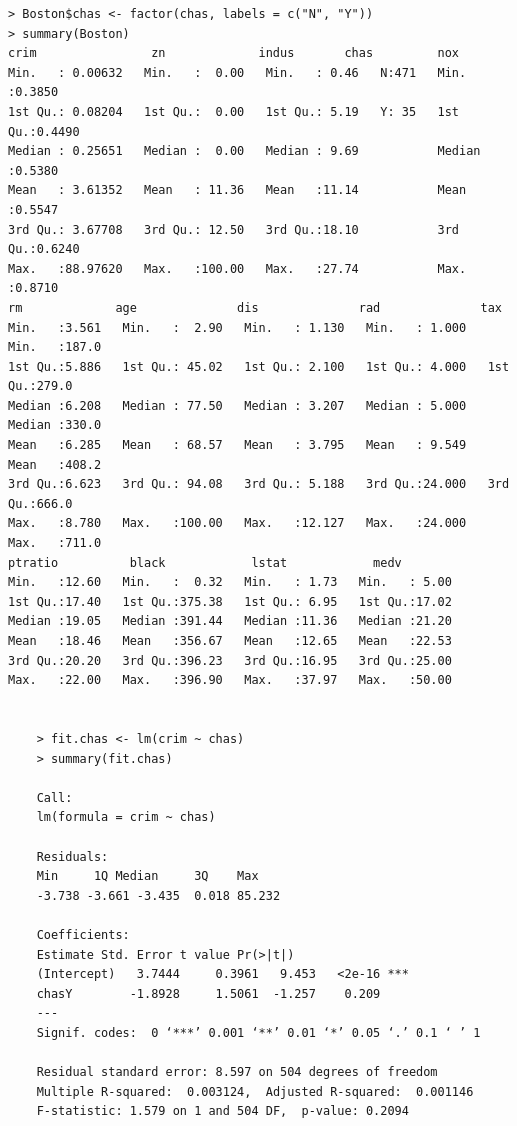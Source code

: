 \documentclass{article}
\begin{document}
\begin{itemize}
\begin{program}
	\begin{verbatim}
> Boston$chas <- factor(chas, labels = c("N", "Y"))
> summary(Boston)
crim                zn             indus       chas         nox        
Min.   : 0.00632   Min.   :  0.00   Min.   : 0.46   N:471   Min.   :0.3850  
1st Qu.: 0.08204   1st Qu.:  0.00   1st Qu.: 5.19   Y: 35   1st Qu.:0.4490  
Median : 0.25651   Median :  0.00   Median : 9.69           Median :0.5380  
Mean   : 3.61352   Mean   : 11.36   Mean   :11.14           Mean   :0.5547  
3rd Qu.: 3.67708   3rd Qu.: 12.50   3rd Qu.:18.10           3rd Qu.:0.6240  
Max.   :88.97620   Max.   :100.00   Max.   :27.74           Max.   :0.8710  
rm             age              dis              rad              tax       
Min.   :3.561   Min.   :  2.90   Min.   : 1.130   Min.   : 1.000   Min.   :187.0  
1st Qu.:5.886   1st Qu.: 45.02   1st Qu.: 2.100   1st Qu.: 4.000   1st Qu.:279.0  
Median :6.208   Median : 77.50   Median : 3.207   Median : 5.000   Median :330.0  
Mean   :6.285   Mean   : 68.57   Mean   : 3.795   Mean   : 9.549   Mean   :408.2  
3rd Qu.:6.623   3rd Qu.: 94.08   3rd Qu.: 5.188   3rd Qu.:24.000   3rd Qu.:666.0  
Max.   :8.780   Max.   :100.00   Max.   :12.127   Max.   :24.000   Max.   :711.0  
ptratio          black            lstat            medv      
Min.   :12.60   Min.   :  0.32   Min.   : 1.73   Min.   : 5.00  
1st Qu.:17.40   1st Qu.:375.38   1st Qu.: 6.95   1st Qu.:17.02  
Median :19.05   Median :391.44   Median :11.36   Median :21.20  
Mean   :18.46   Mean   :356.67   Mean   :12.65   Mean   :22.53  
3rd Qu.:20.20   3rd Qu.:396.23   3rd Qu.:16.95   3rd Qu.:25.00  
Max.   :22.00   Max.   :396.90   Max.   :37.97   Max.   :50.00  
	
	
	> fit.chas <- lm(crim ~ chas)
	> summary(fit.chas)
	
	Call:
	lm(formula = crim ~ chas)
	
	Residuals:
	Min     1Q Median     3Q    Max 
	-3.738 -3.661 -3.435  0.018 85.232 
	
	Coefficients:
	Estimate Std. Error t value Pr(>|t|)    
	(Intercept)   3.7444     0.3961   9.453   <2e-16 ***
	chasY        -1.8928     1.5061  -1.257    0.209    
	---
	Signif. codes:  0 ‘***’ 0.001 ‘**’ 0.01 ‘*’ 0.05 ‘.’ 0.1 ‘ ’ 1
	
	Residual standard error: 8.597 on 504 degrees of freedom
	Multiple R-squared:  0.003124,	Adjusted R-squared:  0.001146 
	F-statistic: 1.579 on 1 and 504 DF,  p-value: 0.2094
	
	\end{verbatim}
\end{program}


\end{itemize}
\end{document}
